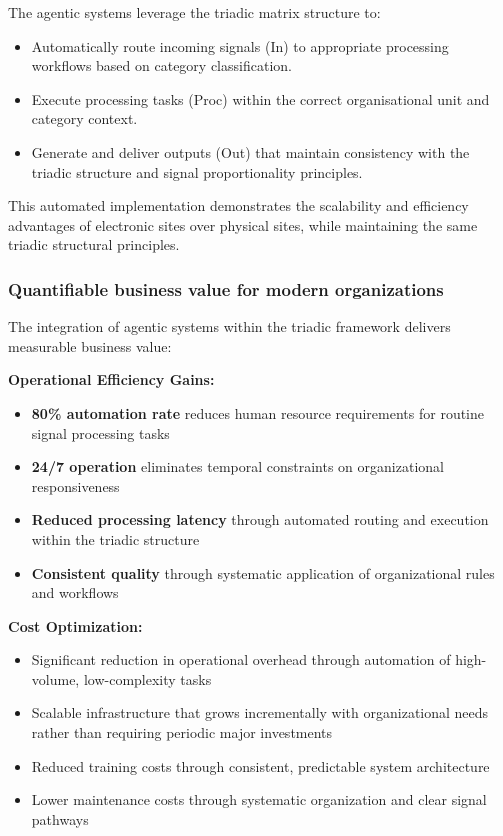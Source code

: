 \documentclass[11pt,a4paper]{article}
\begin{document}
The agentic systems leverage the triadic matrix structure to:
\begin{itemize}[noitemsep]
  \item Automatically route incoming signals (In) to appropriate processing workflows based on category classification.
  \item Execute processing tasks (Proc) within the correct organisational unit and category context.
  \item Generate and deliver outputs (Out) that maintain consistency with the triadic structure and signal proportionality principles.
\end{itemize}

This automated implementation demonstrates the scalability and efficiency advantages of electronic sites over physical sites, while maintaining the same triadic structural principles.

\subsubsection*{Quantifiable business value for modern organizations}

The integration of agentic systems within the triadic framework delivers measurable business value:

\textbf{Operational Efficiency Gains:}
\begin{itemize}[noitemsep]
  \item \textbf{80\% automation rate} reduces human resource requirements for routine signal processing tasks
  \item \textbf{24/7 operation} eliminates temporal constraints on organizational responsiveness
  \item \textbf{Reduced processing latency} through automated routing and execution within the triadic structure
  \item \textbf{Consistent quality} through systematic application of organizational rules and workflows
\end{itemize}

\textbf{Cost Optimization:}
\begin{itemize}[noitemsep]
  \item Significant reduction in operational overhead through automation of high-volume, low-complexity tasks
  \item Scalable infrastructure that grows incrementally with organizational needs rather than requiring periodic major investments
  \item Reduced training costs through consistent, predictable system architecture
  \item Lower maintenance costs through systematic organization and clear signal pathways
\end{itemize}
\end{document}
